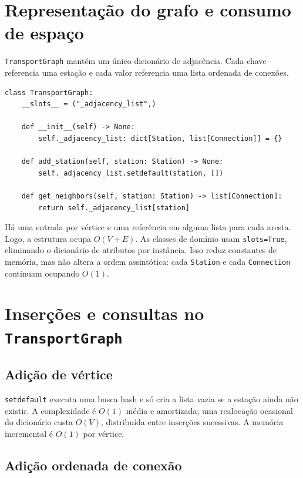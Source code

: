 \documentclass[11pt,a4paper]{article}
\begin{document}
\section{Representação do grafo e consumo de espaço}

\texttt{TransportGraph} mantém um único dicionário de adjacência. Cada chave
referencia uma estação e cada valor referencia uma lista ordenada de conexões.

\begin{lstlisting}[caption={Estrutura e operações básicas em \texttt{backend/app/graph.py:9--32}.}]
class TransportGraph:
    __slots__ = ("_adjacency_list",)

    def __init__(self) -> None:
        self._adjacency_list: dict[Station, list[Connection]] = {}

    def add_station(self, station: Station) -> None:
        self._adjacency_list.setdefault(station, [])

    def get_neighbors(self, station: Station) -> list[Connection]:
        return self._adjacency_list[station]
\end{lstlisting}

Há uma entrada por vértice e uma referência em alguma lista para cada aresta.
Logo, a estrutura ocupa $O(V+E)$. As classes de domínio usam
\texttt{slots=True}, eliminando o dicionário de atributos por instância. Isso
reduz constantes de memória, mas não altera a ordem assintótica: cada
\texttt{Station} e cada \texttt{Connection} continuam ocupando $O(1)$.

\section{Inserções e consultas no \texttt{TransportGraph}}

\subsection{Adição de vértice}

\texttt{setdefault} executa uma busca hash e só cria a lista vazia se a estação
ainda não existir. A complexidade é $O(1)$ média e amortizada; uma realocação
ocasional do dicionário custa $O(V)$, distribuída entre inserções sucessivas.
A memória incremental é $O(1)$ por vértice.

\subsection{Adição ordenada de conexão}
\end{document}
